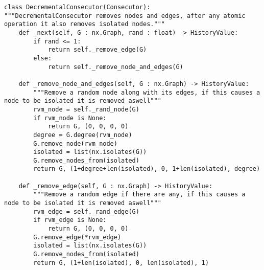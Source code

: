 \begin{lstlisting}[label={code:decremental_consecutor}, caption={Decremental Consecutor}]
class DecrementalConsecutor(Consecutor):
"""DecrementalConsecutor removes nodes and edges, after any atomic operation it also removes isolated nodes."""
	def _next(self, G : nx.Graph, rand : float) -> HistoryValue:
		if rand <= 1:
			return self._remove_edge(G)
		else:
			return self._remove_node_and_edges(G)

	def _remove_node_and_edges(self, G : nx.Graph) -> HistoryValue:
		"""Remove a random node along with its edges, if this causes a node to be isolated it is removed aswell"""
		rvm_node = self._rand_node(G)
		if rvm_node is None:
			return G, (0, 0, 0, 0)
		degree = G.degree(rvm_node)
		G.remove_node(rvm_node)
		isolated = list(nx.isolates(G))
		G.remove_nodes_from(isolated)
		return G, (1+degree+len(isolated), 0, 1+len(isolated), degree)
	
	def _remove_edge(self, G : nx.Graph) -> HistoryValue:
		"""Remove a random edge if there are any, if this causes a node to be isolated it is removed aswell"""
		rvm_edge = self._rand_edge(G)
		if rvm_edge is None:
			return G, (0, 0, 0, 0)
		G.remove_edge(*rvm_edge)
		isolated = list(nx.isolates(G))
		G.remove_nodes_from(isolated)
		return G, (1+len(isolated), 0, len(isolated), 1)
\end{lstlisting}